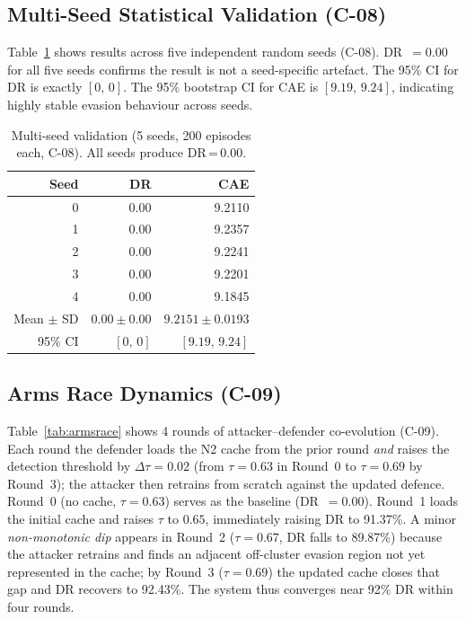 \documentclass[sigconf]{acmart}
\begin{document}
\subsection{Multi-Seed Statistical Validation (C-08)}
\label{sec:multiseed}

Table~\ref{tab:multiseed} shows results across five independent random
seeds (C-08). DR~$= 0.00$ for all five seeds confirms the result is not
a seed-specific artefact. The 95\% CI for DR is exactly $[0,\,0]$.
The 95\% bootstrap CI for CAE is $[9.19,\,9.24]$,
indicating highly stable evasion behaviour across seeds.

\begin{table}[t]
\caption{Multi-seed validation (5 seeds, 200 episodes each, C-08).
All seeds produce DR\,=\,0.00.}
\label{tab:multiseed}
\centering
\small
\begin{tabular}{r r r}
\toprule
Seed & DR & CAE \\
\midrule
0 & 0.00 & 9.2110 \\
1 & 0.00 & 9.2357 \\
2 & 0.00 & 9.2241 \\
3 & 0.00 & 9.2201 \\
4 & 0.00 & 9.1845 \\
\midrule
Mean $\pm$ SD & $0.00 \pm 0.00$ & $9.2151 \pm 0.0193$ \\
95\% CI       & $[0,\,0]$ & $[9.19,\,9.24]$ \\
\bottomrule
\end{tabular}
\end{table}

\subsection{Arms Race Dynamics (C-09)}
\label{sec:armsrace}

Table~\ref{tab:armsrace} shows 4 rounds of attacker--defender
co-evolution (C-09). Each round the defender loads the N2 cache from
the prior round \emph{and} raises the detection threshold by
$\Delta\tau = 0.02$ (from $\tau=0.63$ in Round~0 to $\tau=0.69$ by
Round~3); the attacker then retrains from scratch against the updated
defence. Round~0 (no cache, $\tau=0.63$) serves as the baseline
(DR~$= 0.00$). Round~1 loads the initial cache and raises $\tau$ to
$0.65$, immediately raising DR to 91.37\%. A minor
\emph{non-monotonic dip} appears in Round~2 ($\tau=0.67$, DR falls
to 89.87\%) because the attacker retrains and finds an adjacent
off-cluster evasion region not yet represented in the cache; by
Round~3 ($\tau=0.69$) the updated cache closes that gap and DR
recovers to 92.43\%. The system thus converges near 92\% DR within
four rounds.
\end{document}
